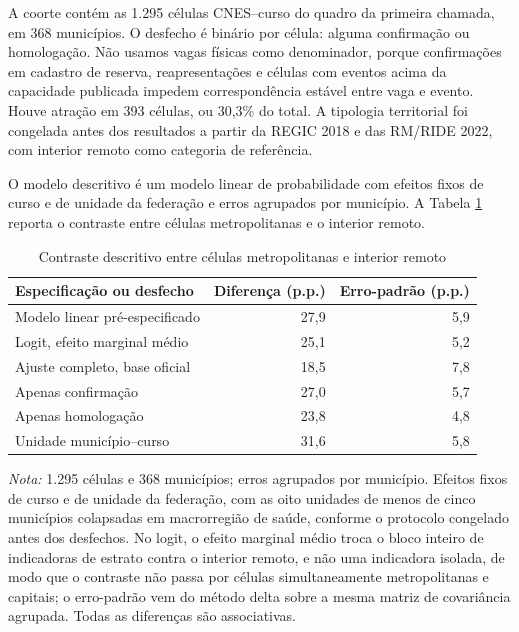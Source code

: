 \documentclass[11pt,a4paper]{article}
\begin{document}
A coorte contém as 1.295 células CNES--curso do quadro da primeira chamada, em
368 municípios. O desfecho é binário por célula: alguma confirmação ou
homologação. Não usamos vagas físicas como denominador, porque confirmações em
cadastro de reserva, reapresentações e células com eventos acima da capacidade
publicada impedem correspondência estável entre vaga e evento. Houve atração em
393 células, ou 30,3\% do total. A tipologia territorial foi congelada antes dos
resultados a partir da REGIC 2018 e das RM/RIDE 2022, com interior remoto como
categoria de referência.

O modelo descritivo é um modelo linear de probabilidade com efeitos fixos de
curso e de unidade da federação e erros agrupados por município. A Tabela
\ref{tab:a4} reporta o contraste entre células metropolitanas e o interior
remoto.

\begin{table}[htbp]
\centering
\small
\caption{Contraste descritivo entre células metropolitanas e interior remoto}
\label{tab:a4}
\begin{tabular}{lrr}
\toprule
Especificação ou desfecho & Diferença (p.p.) & Erro-padrão (p.p.) \\
\midrule
Modelo linear pré-especificado & 27,9 & 5,9 \\
Logit, efeito marginal médio & 25,1 & 5,2 \\
Ajuste completo, base oficial & 18,5 & 7,8 \\
Apenas confirmação & 27,0 & 5,7 \\
Apenas homologação & 23,8 & 4,8 \\
Unidade município--curso & 31,6 & 5,8 \\
\bottomrule
\end{tabular}

\vspace{2pt}
\begin{minipage}{0.86\textwidth}
\footnotesize \textit{Nota:} 1.295 células e 368 municípios; erros agrupados por
município. Efeitos fixos de curso e de unidade da federação, com as oito unidades
de menos de cinco municípios colapsadas em macrorregião de saúde, conforme o
protocolo congelado antes dos desfechos. No logit, o efeito marginal médio troca
o bloco inteiro de indicadoras de estrato contra o interior remoto, e não uma
indicadora isolada, de modo que o contraste não passa por células
simultaneamente metropolitanas e capitais; o erro-padrão vem do método delta
sobre a mesma matriz de covariância agrupada. Todas as diferenças são
associativas.
\end{minipage}
\end{table}
\end{document}

